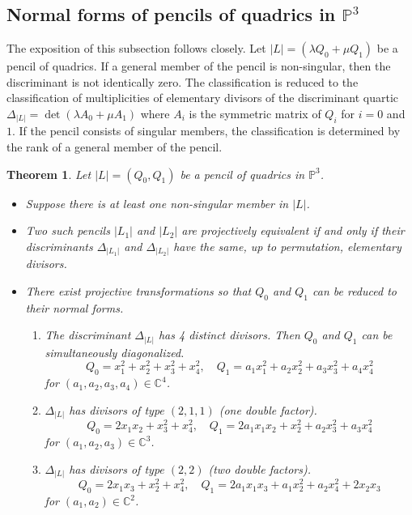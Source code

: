 \documentclass{amsart}[12pt]
\newtheorem{theorem}{Theorem}[section]
\theoremstyle{definition}
\theoremstyle{remark}
\numberwithin{equation}{section}
\newcommand{\abs}[1]{\lvert#1\rvert}
\begin{document}
\subsection{Normal forms of pencils of quadrics in $\mathbb{P}^3$}
The exposition of this subsection follows \cite{HP52} closely. Let $\abs{L} = (\lambda Q_0 + \mu Q_1)$ be a pencil of quadrics. If a general member of the pencil is non-singular, then the discriminant is not identically zero. The classification is reduced to the classification of multiplicities of elementary divisors of the discriminant quartic $\Delta_{\abs{L}} = \det (\lambda A_0 + \mu A_1)$ where $A_i$ is the symmetric matrix of $Q_i$ for $i = 0$ and $1$. If the pencil consists of singular members, the classification is determined by the rank of a general member of the pencil. 

\begin{theorem}\cite[Chap. XIII, Sec. 10, Theorem I, II, III]{HP52} Let $\abs{L} = (Q_0, Q_1)$ be a pencil of quadrics in $\mathbb{P}^3$. 
\begin{itemize}
\item[(I)] Suppose there is at least one non-singular member in $\abs{L}$. 
\end{itemize}
\begin{itemize} 
\item[(a).] Two such pencils $\abs{L_1}$ and $\abs{L_2}$ are projectively equivalent if and only if their discriminants $\Delta_{\abs{L_1}}$ and $\Delta_{\abs{L_2}}$ have the same, up to permutation, elementary divisors.
\item[(b).] There exist projective transformations so that $Q_0$ and $Q_1$ can be reduced to their normal forms. 
\begin{enumerate}
\item[(I. 1)] The discriminant $\Delta_{\abs{L}}$ has 4 distinct divisors. Then $Q_0$ and $Q_1$ can be simultaneously diagonalized.
\[
Q_0 = x_1^2 + x_2^2 + x_3^2 + x_4^2, \quad Q_1 = a_1x_1^2 + a_2x_2^2 + a_3x_3^2 + a_4x_4^2
\]
for $(a_1, a_2, a_3, a_4) \in \mathbb{C}^4$.
\item[(I. 2)] $\Delta_{\abs{L}}$ has divisors of type $(2, 1, 1)$ (one double factor). 
\[
Q_0 = 2x_1x_2 + x_3^2 + x_4^2, \quad Q_1 = 2a_1x_1x_2 + x_2^2 + a_2x_3^2 + a_3x_4^2
\]
for $(a_1, a_2, a_3) \in \mathbb{C}^3$.
\item[(I. 3)] $\Delta_{\abs{L}}$ has divisors of type $(2, 2)$ (two double factors). 
\[
Q_0 = 2x_1x_3 + x_2^2 + x_4^2, \quad Q_1 = 2a_1x_1x_3 + a_1x_2^2 + a_2x_4^2 + 2x_2x_3
\]
for $(a_1, a_2) \in \mathbb{C}^2$.

\end{enumerate}
\end{itemize}
\end{theorem}
\end{document}
